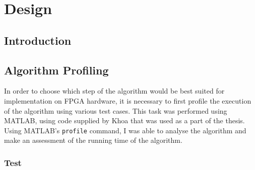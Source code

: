 \chapter{Design}
\label{ch:design}

\section{Introduction}
\label{sec:designIntroduction}


\section{Algorithm Profiling}
\label{sec:algorithmProfiling}
In order to choose which step of the algorithm would be best suited for 
implementation on FPGA hardware, it is necessary to first profile the execution 
of the algorithm using various test cases. This task was performed using MATLAB,
using code supplied by Khoa that was used as a part of the thesis. Using 
MATLAB's \verb+profile+ command, I was able to analyse the algorithm and make an
assessment of the running time of the algorithm.

\subsection{Test}

